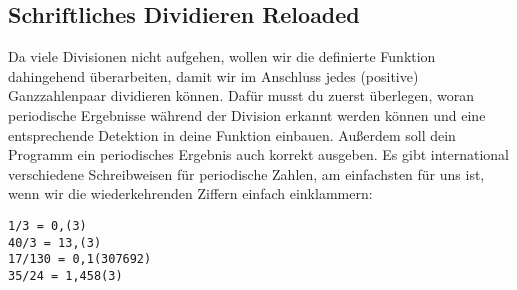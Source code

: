 \subsection{Schriftliches Dividieren Reloaded }
Da viele Divisionen nicht aufgehen, wollen wir die definierte Funktion dahingehend überarbeiten, damit wir im Anschluss jedes (positive) Ganzzahlenpaar dividieren können. Dafür musst du zuerst überlegen, woran periodische Ergebnisse während der Division erkannt werden können und eine entsprechende Detektion in deine Funktion einbauen. Außerdem soll dein Programm ein periodisches Ergebnis auch korrekt ausgeben. Es gibt international verschiedene Schreibweisen für periodische Zahlen, am einfachsten für uns ist, wenn wir die wiederkehrenden Ziffern einfach einklammern:
\begin{lstlisting}
1/3 = 0,(3)
40/3 = 13,(3)
17/130 = 0,1(307692)
35/24 = 1,458(3)
\end{lstlisting}